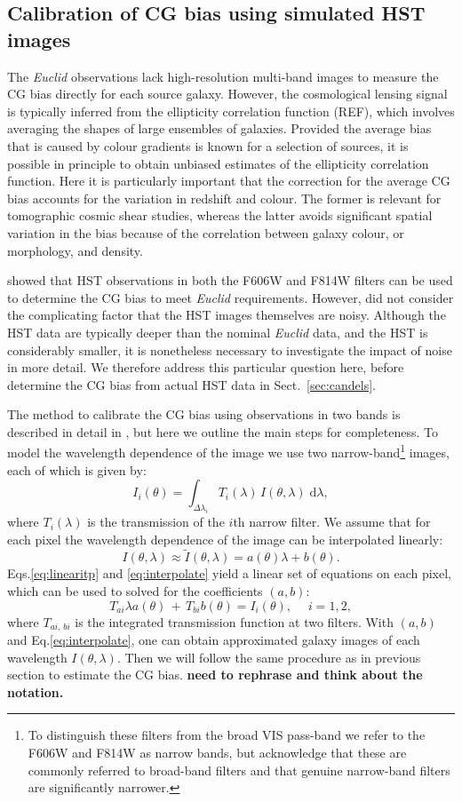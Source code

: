 \documentclass[useAMS,usenatbib]{mnras}
\renewcommand{\d}{\mathrm{d}}
\newcommand{\be}{\begin{equation}}
\newcommand{\ee}{\end{equation}}
\def\elabel#1{\label{eq:#1}}
\begin{document}
\subsection{Calibration of CG bias using simulated HST images}
\label{sec:noisy}

The {\it Euclid} observations lack high-resolution multi-band images to measure the CG bias directly for each source galaxy. However, the cosmological lensing signal is typically inferred from the ellipticity correlation function (REF), which involves  averaging the shapes of large ensembles of galaxies. Provided the average bias that is caused by colour gradients is known for a selection of sources, it is possible in principle to obtain unbiased estimates of the ellipticity correlation function. Here it is particularly important that the correction for the average CG bias accounts for the variation in redshift
and colour. The former is relevant for tomographic cosmic shear studies, whereas the latter avoids
significant spatial variation in the bias because of the correlation between galaxy colour, or morphology, and density.

 showed that HST observations  in both the F606W and F814W filters can be used to determine the CG bias to meet {\it Euclid} requirements. However,  did not consider the complicating factor that the HST images themselves are noisy. Although the HST data are typically deeper than the nominal {\it Euclid} data, and the HST is considerably smaller, it is nonetheless necessary to investigate the impact of noise in more detail. We therefore address this particular question here, before determine the CG bias from actual HST data in 
Sect.~\ref{sec:candels}.

The method to calibrate the CG bias using observations in two bands is described in detail
in , but here we outline the main steps for completeness. To model the
wavelength dependence of the image we use two narrow-band\footnote{To distinguish these filters from the broad VIS pass-band we refer to the F606W and F814W as narrow bands, but acknowledge that these are commonly referred to broad-band filters and that genuine narrow-band filters are significantly narrower.} images, each of which is given by:
%
\be
I_i(\theta) = \int_{\Delta \lambda_i} T_i(\lambda)\, I(\theta,\lambda) \;\d \lambda,
\elabel{linearitp}
\ee
%
where $T_i(\lambda)$ is the transmission of the $i$th narrow filter. We assume that for each pixel the wavelength dependence of the image can be interpolated linearly:
%
\be
I(\theta,\lambda) \approx
\tilde{I}(\theta,\lambda)=a(\theta)\lambda + b(\theta).
\elabel{interpolate}
\ee
%
Eqs.\ref{eq:linearitp} and \ref{eq:interpolate} yield a linear set of
equations on each pixel, which can be used to solved for the
coefficients $(a,b)$:
%
\be
T_{ai} \lambda a(\theta) \,+\,T_{bi} b(\theta) = I_i(\theta), \quad\; i=1,2,
\elabel{lineareq}
\ee
%
where $T_{ai,\,bi}$ is the integrated transmission function at two
filters. With $(a,b)$ and Eq.\ref{eq:interpolate}, one can obtain
approximated galaxy images of each wavelength
$I(\theta,\lambda)$. Then we will follow the same procedure as in
previous section to estimate the CG bias. {\bf need to rephrase and 
think about the notation.}
\end{document}
